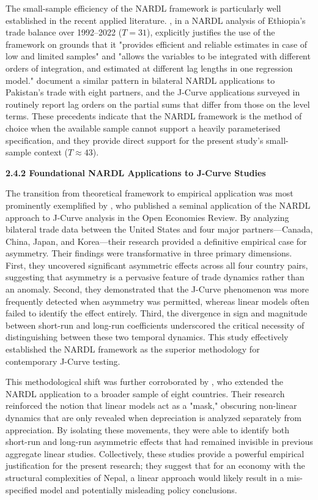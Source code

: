 \documentclass[12pt]{article}
\begin{document}
The small-sample efficiency of the NARDL framework is particularly well established in the recent applied literature. \textcite{Abegaz2024-wp}, in a NARDL analysis of Ethiopia's trade balance over 1992--2022 ($T = 31$), explicitly justifies the use of the framework on grounds that it "provides efficient and reliable estimates in case of low and limited samples" and "allows the variables to be integrated with different orders of integration, and estimated at different lag lengths in one regression model." \textcite{Iqbal2021-pu} document a similar pattern in bilateral NARDL applications to Pakistan's trade with eight partners, and the J-Curve applications surveyed in \textcite{Bahmani-Oskooee2016-xv} routinely report lag orders on the partial sums that differ from those on the level terms. These precedents indicate that the NARDL framework is the method of choice when the available sample cannot support a heavily parameterised specification, and they provide direct support for the present study's small-sample context ($T \approx 43$).

\vspace{0.5cm}
\noindent\textbf{2.4.2 Foundational NARDL Applications to J-Curve Studies}

The transition from theoretical framework to empirical application was most prominently exemplified by \textcite{Bahmani-Oskooee2016-xv}, who published a seminal application of the NARDL approach to J-Curve analysis in the Open Economies Review. By analyzing bilateral trade data between the United States and four major partners—Canada, China, Japan, and Korea—their research provided a definitive empirical case for asymmetry. Their findings were transformative in three primary dimensions. First, they uncovered significant asymmetric effects across all four country pairs, suggesting that asymmetry is a pervasive feature of trade dynamics rather than an anomaly. Second, they demonstrated that the J-Curve phenomenon was more frequently detected when asymmetry was permitted, whereas linear models often failed to identify the effect entirely. Third, the divergence in sign and magnitude between short-run and long-run coefficients underscored the critical necessity of distinguishing between these two temporal dynamics. This study effectively established the NARDL framework as the superior methodology for contemporary J-Curve testing.

This methodological shift was further corroborated by \textcite{Arize2017-ar}, who extended the NARDL application to a broader sample of eight countries. Their research reinforced the notion that linear models act as a "mask," obscuring non-linear dynamics that are only revealed when depreciation is analyzed separately from appreciation. By isolating these movements, they were able to identify both short-run and long-run asymmetric effects that had remained invisible in previous aggregate linear studies. Collectively, these studies provide a powerful empirical justification for the present research; they suggest that for an economy with the structural complexities of Nepal, a linear approach would likely result in a mis-specified model and potentially misleading policy conclusions.
\end{document}
